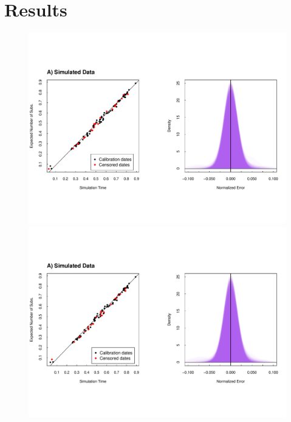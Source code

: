 \section{Results} \label{sec:results}

\begin{figure}[!ht] \label{fig:results1}
	\centering
	\includegraphics[trim=0cm 0cm 0cm 6cm, clip=true, scale=0.425]{figures/simulated.pdf} \\
	\includegraphics[trim=0cm 0cm 0cm 7cm, clip=true,scale=0.425]{figures/simulated_latent.pdf}\\

\end{figure}
